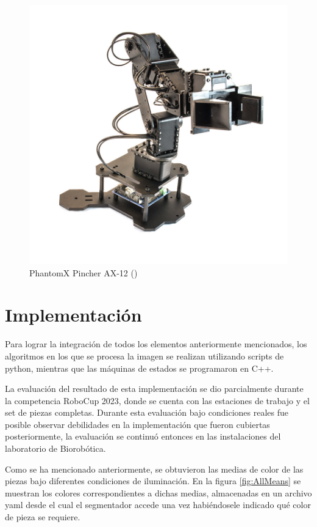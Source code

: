             \begin{figure}[ht]
                \centering
                \includegraphics[scale=0.2]{Figures/Phantom_Pincher.jpg}
                    \caption{PhantomX Pincher AX-12 (\cite*{Inerbotix_pincher_arm})}
                    \label{fig:Phantom_Pincher}
            \end{figure}

\section{Implementación}
Para lograr la integración de todos los elementos anteriormente mencionados, los algoritmos en los que se procesa la imagen se realizan utilizando scripts de python, mientras que las máquinas de estados se programaron en C++.

La evaluación del resultado de esta implementación se dio parcialmente durante la competencia RoboCup 2023, donde se cuenta con las estaciones de trabajo y el set de piezas completas. Durante esta evaluación bajo condiciones reales fue posible observar debilidades en la implementación que fueron cubiertas posteriormente, la evaluación se continuó entonces en las instalaciones del laboratorio de Biorobótica. 

Como se ha mencionado anteriormente, se obtuvieron las medias de color de las piezas bajo diferentes condiciones de iluminación. En la figura \ref{fig:AllMeans} se muestran los colores correspondientes a dichas medias, almacenadas en un archivo yaml desde el cual el segmentador accede una vez habiéndosele indicado qué color de pieza se requiere. 

